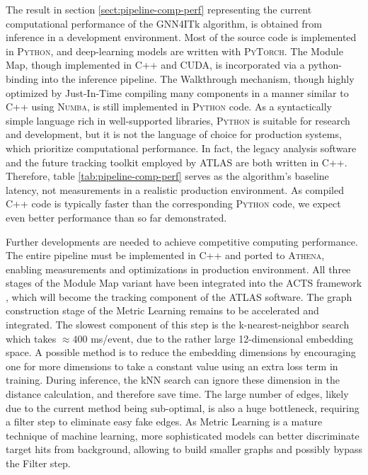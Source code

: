 The result in section \ref{sect:pipeline-comp-perf} representing the current computational performance of the GNN4ITk algorithm, is obtained from inference in a development environment.
Most of the source code is implemented in \textsc{Python}, and deep-learning models are written with \textsc{PyTorch}.
The Module Map, though implemented in C++ and CUDA, is incorporated via a python-binding into the inference pipeline.
The Walkthrough mechanism, though highly optimized by Just-In-Time compiling many components in a manner similar to C++ using \textsc{Numba}\cite{Numba}, is still implemented in \textsc{Python} code.
As a syntactically simple language rich in well-supported libraries, \textsc{Python} is suitable for research and development, but it is not the language of choice for production systems, which prioritize computational performance.
In fact, the legacy analysis software and the future tracking toolkit employed by ATLAS are both written in C++.
Therefore, table \ref{tab:pipeline-comp-perf} serves as the algorithm's baseline latency, not measurements in a realistic production environment.
As compiled C++ code is typically faster than the corresponding \textsc{Python} code, we expect even better performance than so far demonstrated. 


Further developments are needed to achieve competitive computing performance. 
The entire pipeline must be implemented in C++ and ported to \textsc{Athena}\cite{atlas_collaboration_2021_4772550}, enabling measurements and optimizations in production environment. 
All three stages of the Module Map variant have been integrated into the ACTS framework \cite{andreas_salzburger_2025_15260074}, which will become the tracking component of the ATLAS software. 
The graph construction stage of the Metric Learning remains to be accelerated and integrated. 
The slowest component of this step is the k-nearest-neighbor search which takes $\approx 400$ ms/event, due to the rather large 12-dimensional embedding space.
A possible method is to reduce the embedding dimensions by encouraging one for more dimensions to take a constant value using an extra loss term in training. 
During inference, the kNN search can ignore these dimension in the distance calculation, and therefore save time. 
The large number of edges, likely due to the current method being sub-optimal, is also a huge bottleneck, requiring a filter step to eliminate easy fake edges.
As Metric Learning is a mature technique of machine learning, more sophisticated models can better discriminate target hits from background, allowing to build smaller graphs and possibly bypass the Filter step. 


